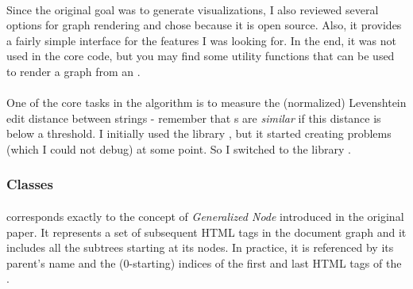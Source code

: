 \documentclass[10pt]{article}
\newcommand{\gn}{\path{GNode}}
\newcommand{\dr}{\path{DataRegion}}
\begin{document}

\paragraph{} Since the original goal was to generate visualizations, I also reviewed several options for graph rendering and chose  because it is open source. Also, it provides a fairly simple interface for the features I was looking for. In the end, it was not used in the core code, but you may find some utility functions that can be used to render a graph from an .

\paragraph{} One of the core tasks in the algorithm is to measure the (normalized) Levenshtein edit distance between strings - remember that \gn{}s are \emph{similar} if this distance is below a threshold. I initially used the library \footnotemark, but it started creating problems (which I could not debug) at some point. So I switched to the library \footnotemark.





\subsubsection{Classes} \label{txt:classes}

\paragraph{\gn{}}

corresponds exactly to the concept of \emph{Generalized Node} introduced in the original paper. It represents a set of subsequent HTML tags in the document graph and it includes all the subtrees starting at its nodes. In practice, it is referenced by its parent's name and the (0-starting) indices of the first and last HTML tags of the \gn{}.

\paragraph{\dr{}} 
\end{document}

